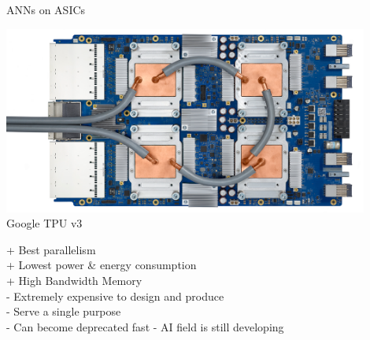 \begin{frame}{ANNs on ASICs}
	\begin{minipage}{0.4\textwidth}
		\centering
		\includegraphics[width=0.9\textwidth]{../Images/Hardware/tpu-v3.png}\\
		Google TPU v3
	\end{minipage}%
	\begin{minipage}{0.6\textwidth}
		+ Best parallelism\\
		+ Lowest power \& energy consumption\\
		+ High Bandwidth Memory\\
		- Extremely expensive to design and produce\\
		- Serve a single purpose\\
		- Can become deprecated fast - AI field is still developing
	\end{minipage}
\end{frame}

